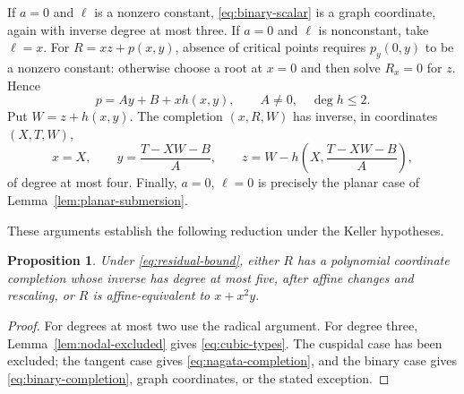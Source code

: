 \documentclass[11pt,reqno]{amsart}
\numberwithin{equation}{section}
\theoremstyle{plain}
\newtheorem{proposition}[theorem]{Proposition}
\theoremstyle{definition}
\theoremstyle{remark}
\begin{document}
If $a=0$ and $\ell$ is a nonzero constant, \eqref{eq:binary-scalar} is a graph coordinate, again with inverse degree at most three. If $a=0$ and $\ell$ is nonconstant, take $\ell=x$. For $R=xz+p(x,y)$, absence of critical points requires $p_y(0,y)$ to be a nonzero constant: otherwise choose a root at $x=0$ and then solve $R_x=0$ for $z$. Hence
\[
p=Ay+B+xh(x,y),\qquad A\ne0,\quad\deg h\le2.
\]
Put $W=z+h(x,y)$. The completion $(x,R,W)$ has inverse, in coordinates $(X,T,W)$,
\begin{equation}\label{eq:binary-completion}
x=X,\qquad y=\frac{T-XW-B}{A},\qquad
z=W-h\left(X,\frac{T-XW-B}{A}\right),
\end{equation}
of degree at most four. Finally, $a=0$, $\ell=0$ is precisely the planar case of Lemma~\ref{lem:planar-submersion}.

These arguments establish the following reduction under the Keller
hypotheses.
\begin{proposition}\label{prop:cubic-reduction}
Under \eqref{eq:residual-bound}, either $R$ has a polynomial coordinate completion whose inverse has degree at most five, after affine changes and rescaling, or $R$ is affine-equivalent to $x+x^2y$.
\end{proposition}
\begin{proof}
For degrees at most two use the radical argument. For degree three, Lemma~\ref{lem:nodal-excluded} gives \eqref{eq:cubic-types}. The cuspidal case has been excluded; the tangent case gives \eqref{eq:nagata-completion}, and the binary case gives \eqref{eq:binary-completion}, graph coordinates, or the stated exception.
\end{proof}
\end{document}
